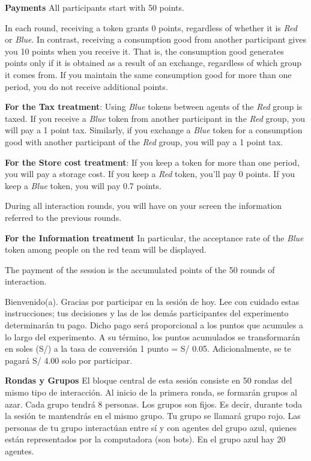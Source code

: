 {{\textbf{ Payments }
All participants start with 50 points. 

In each round, receiving a token grants 0 points, regardless of whether it is \textit{Red} or \textit{Blue}.
In contrast, receiving a consumption good from another participant gives you 10 points when you receive it.
That is, the consumption good generates points only if it is obtained as a result of an exchange, regardless of which group it comes from.
If you maintain the same consumption good for more than one period, you do not receive additional points. 


\textbf{For the Tax treatment}: 
Using \textit{Blue} tokens between agents of the \textit{Red} group is taxed. 
If you receive a \textit{Blue} token from another participant in the \textit{Red} group, you will pay a 1 point tax.
Similarly, if you exchange a \textit{Blue} token for a consumption good with another participant of the \textit{Red} group, you will pay a 1 point tax.


\textbf{For the Store cost treatment}: 
If you keep a token for more than one period, you will pay a storage cost.
If you keep a \textit{Red} token, you'll pay 0 points.
If you keep a \textit{Blue} token, you will pay 0.7 points.


During all interaction rounds, you will have on your screen the information referred to the previous rounds.

\textbf{For the Information treatment}
In particular,  the acceptance rate of the \textit{Blue} token among people on the red team will be displayed. 


The payment of the session is the accumulated points of the 50 rounds of interaction.



 Bienvenido(a). Gracias por participar en la sesión de hoy. Lee con cuidado estas instrucciones; tus decisiones y las de los demás participantes del experimento determinarán tu pago. Dicho pago será proporcional a los puntos  que acumules a lo largo del experimento. A su término, los puntos acumulados se transformarán en soles (S/) a la tasa de conversión 1 punto = S/ 0.05. Adicionalmente, se te pagará S/ 4.00 solo por participar.
    
\textbf{    Rondas y Grupos }
El bloque central de esta sesión consiste en 50 rondas del mismo tipo de  interacción. Al inicio de la primera ronda, se formarán grupos al azar. Cada grupo tendrá 8 personas. Los grupos son fijos. Es decir, durante toda la sesión te mantendrás en el mismo grupo. Tu grupo se llamará grupo rojo. Las personas de tu grupo interactúan entre sí y con agentes del grupo azul, quienes están representados por la computadora (son bots). En el grupo azul hay 20 agentes.
    
}}
